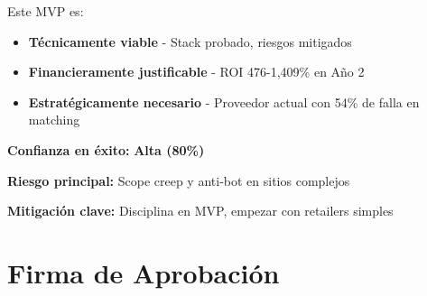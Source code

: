 \documentclass[12pt,a4paper]{article}
\begin{document}
\begin{center}
\begin{tcolorbox}[width=0.95\textwidth, colback=successgreen!10, colframe=successgreen, title={\Large\textbf{PROCEDER INMEDIATAMENTE}}]

\large
Este MVP es:
\begin{itemize}[leftmargin=*]
    \item \textbf{Técnicamente viable} - Stack probado, riesgos mitigados
    \item \textbf{Financieramente justificable} - ROI 476-1,409\% en Año 2
    \item \textbf{Estratégicamente necesario} - Proveedor actual con 54\% de falla en matching
\end{itemize}

\vspace{0.5cm}

\textbf{Confianza en éxito:} \textcolor{successgreen}{\textbf{Alta (80\%)}}

\textbf{Riesgo principal:} Scope creep y anti-bot en sitios complejos

\textbf{Mitigación clave:} Disciplina en MVP, empezar con retailers simples

\vspace{0.5cm}

\begin{center}
\end{center}

\end{tcolorbox}
\end{center}

\newpage
\section*{Firma de Aprobación}

\vspace{1cm}
\end{document}
